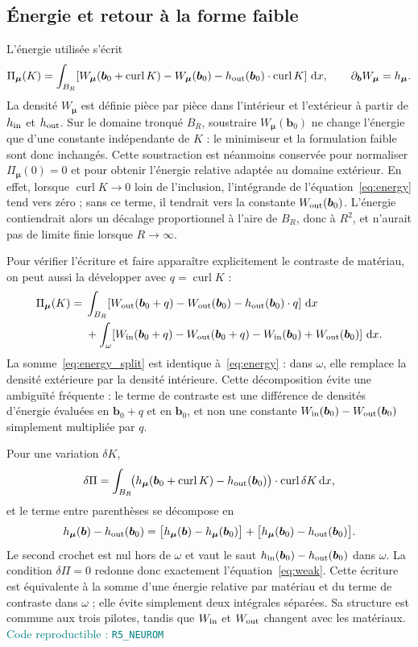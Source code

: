 \documentclass[10pt,a4paper]{article}
\newcommand{\curl}{\operatorname{curl}}
\newcommand{\dd}{\,\mathrm d}
\newcommand{\codecell}[1]{\textcolor{teal}{\textsf{Code reproductible : \texttt{#1}}}}
\begin{document}
\subsection{Énergie et retour à la forme faible}
L'énergie utilisée s'écrit
\begin{equation}\label{eq:energy}
\Pi_{\bm\mu}(K)=\int_{B_R}\!\left[W_{\bm\mu}(\bm b_0+\curl K)-W_{\bm\mu}(\bm b_0)-h_{\rm out}(\bm b_0)\cdot\curl K\right]\dd x,
\qquad \partial_{\bm b}W_{\bm\mu}=h_{\bm\mu}.
\end{equation}
La densité $W_{\bm\mu}$ est définie pièce par pièce dans l'intérieur et l'extérieur à partir de $h_{\rm in}$ et $h_{\rm out}$. Sur le domaine tronqué $B_R$, soustraire $W_{\bm\mu}(\bm b_0)$ ne change l'énergie que d'une constante indépendante de $K$ : le minimiseur et la formulation faible sont donc inchangés. Cette soustraction est néanmoins conservée pour normaliser $\Pi_{\bm\mu}(0)=0$ et pour obtenir l'énergie relative adaptée au domaine extérieur. En effet, lorsque $\curl K\to0$ loin de l'inclusion, l'intégrande de l'équation~\eqref{eq:energy} tend vers zéro ; sans ce terme, il tendrait vers la constante $W_{\rm out}(\bm b_0)$. L'énergie contiendrait alors un décalage proportionnel à l'aire de $B_R$, donc à $R^2$, et n'aurait pas de limite finie lorsque $R\to\infty$.

Pour vérifier l'écriture et faire apparaître explicitement le contraste de matériau, on peut aussi la développer avec $q=\curl K$ :
\begin{equation}\label{eq:energy_split}
\begin{aligned}
\Pi_{\bm\mu}(K)
={}&\int_{B_R}\!\left[W_{\rm out}(\bm b_0+q)-W_{\rm out}(\bm b_0)
-h_{\rm out}(\bm b_0)\cdot q\right]\dd x\\
&+\int_{\omega}\!\left[W_{\rm in}(\bm b_0+q)-W_{\rm out}(\bm b_0+q)
-W_{\rm in}(\bm b_0)+W_{\rm out}(\bm b_0)\right]\dd x .
\end{aligned}
\end{equation}
La somme~\eqref{eq:energy_split} est identique à~\eqref{eq:energy} : dans $\omega$, elle remplace la densité extérieure par la densité intérieure. Cette décomposition évite une ambiguïté fréquente : le terme de contraste est une différence de densités d'énergie évaluées en $\bm b_0+q$ et en $\bm b_0$, et non une constante $W_{\rm in}(\bm b_0)-W_{\rm out}(\bm b_0)$ simplement multipliée par $q$.

Pour une variation $\delta K$,
\[
\delta\Pi=\int_{B_R}\!\bigl(h_{\bm\mu}(\bm b_0+\curl K)-h_{\rm out}(\bm b_0)\bigr)\cdot\curl\delta K\dd x,
\]
et le terme entre parenthèses se décompose en
\[
h_{\bm\mu}(\bm b)-h_{\rm out}(\bm b_0)
=\bigl[h_{\bm\mu}(\bm b)-h_{\bm\mu}(\bm b_0)\bigr]
+\bigl[h_{\bm\mu}(\bm b_0)-h_{\rm out}(\bm b_0)\bigr].
\]
Le second crochet est nul hors de $\omega$ et vaut le saut $h_{\rm in}(\bm b_0)-h_{\rm out}(\bm b_0)$ dans $\omega$. La condition $\delta\Pi=0$ redonne donc exactement l'équation~\eqref{eq:weak}. Cette écriture est équivalente à la somme d'une énergie relative par matériau et du terme de contraste dans $\omega$ ; elle évite simplement deux intégrales séparées. Sa structure est commune aux trois pilotes, tandis que $W_{\rm in}$ et $W_{\rm out}$ changent avec les matériaux. \codecell{R5\_NEUROM}
\end{document}

